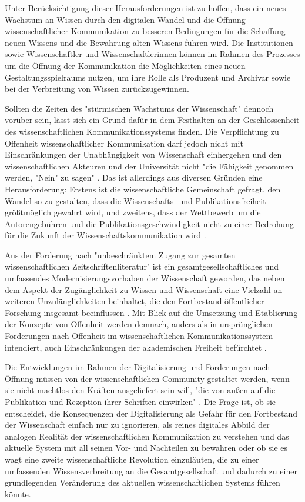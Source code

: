 Unter Berücksichtigung dieser Herausforderungen ist zu hoffen, dass ein neues Wachstum an Wissen durch den digitalen Wandel und die Öffnung wissenschaftlicher Kommunikation zu besseren Bedingungen für die Schaffung neuen Wissens und die Bewahrung alten Wissens führen wird. Die Institutionen sowie Wissenschaftler und Wissenschaftlerinnen können im Rahmen des Prozesses um die Öffnung der Kommunikation die Möglichkeiten eines neuen Gestaltungsspielraums nutzen, um ihre Rolle als Produzent und Archivar sowie bei der Verbreitung von Wissen zurückzugewinnen.

Sollten die Zeiten des "stürmischen Wachstums der Wissenschaft" \cite{Koelbel_2002} dennoch vorüber sein, lässt sich ein Grund dafür in dem Festhalten an der Geschlossenheit des wissenschaftlichen Kommunikationssystems finden. Die Verpflichtung zu Offenheit wissenschaftlicher Kommunikation darf jedoch nicht mit Einschränkungen der Unabhängigkeit von Wissenschaft einhergehen und den wissenschaftlichen Akteuren und der Universität nicht "die Fähigkeit genommen werden, "Nein" zu sagen" \cite[:12]{Neidhardt_2006}. Das ist allerdings aus diversen Gründen eine Herausforderung: Erstens ist die wissenschaftliche Gemeinschaft gefragt, den Wandel so zu gestalten, dass die Wissenschafts- und Publikationsfreiheit größtmöglich gewahrt wird, und zweitens, dass der Wettbewerb um die Autorengebühren und die Publikationsgeschwindigkeit nicht zu einer Bedrohung für die Zukunft der Wissenschaftskommunikation wird \cite{Beall_2012} \cite{Lossau_2007}.

Aus der Forderung nach "unbeschränktem Zugang zur gesamten wissenschaftlichen Zeitschriftenliteratur" \cite{BOAI_2012} ist ein gesamtgesellschaftliches und umfassendes Modernisierungsvorhaben der Wissenschaft geworden, das neben dem Aspekt der Zugänglichkeit zu Wissen und Wissenschaft eine Vielzahl an weiteren Unzulänglichkeiten beinhaltet, die den Fortbestand öffentlicher Forschung insgesamt beeinflussen \cite{Brembs_2015}. Mit Blick auf die Umsetzung und Etablierung der Konzepte von Offenheit werden demnach, anders als in ursprünglichen Forderungen nach Offenheit im wissenschaftlichen Kommunikationssystem intendiert, auch Einschränkungen der akademischen Freiheit befürchtet \cite{Hagner_2015}.

Die Entwicklungen im Rahmen der Digitalisierung und Forderungen nach Öffnung müssen von der wissenschaftlichen Community gestaltet werden, wenn sie nicht machtlos den Kräften ausgeliefert sein will, "die von außen auf die Publikation und Rezeption ihrer Schriften einwirken" \cite[:6]{Hirschi_2015}. Die Frage ist, ob sie entscheidet, die Konsequenzen der Digitalisierung als Gefahr für den Fortbestand der Wissenschaft einfach nur zu ignorieren, als reines digitales Abbild der analogen Realität der wissenschaftlichen Kommunikation zu verstehen und das aktuelle System mit all seinen Vor- und Nachteilen zu bewahren oder ob sie es wagt eine zweite wissenschaftliche Revolution einzuläuten, die zu einer umfassenden Wissensverbreitung an die Gesamtgesellschaft und dadurch zu einer grundlegenden Veränderung des aktuellen wissenschaftlichen Systems führen könnte.


